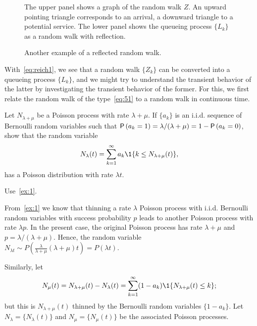 \begin{figure}[ht]
  \centering

%
\caption{The upper panel shows a graph of the random walk $Z$. An
  upward pointing triangle corresponds to an arrival, a downward
  triangle to a potential service. The lower panel shows the queueing
  process $\{L_k\}$ as a random walk with reflection.}
\label{fig:random_bernoulli}
\end{figure}

\begin{figure}[ht]
  \centering

\caption{Another example of a reflected random walk.}
\label{fig:random_walk}
\end{figure}


With~\cref{eq:reich1},  we see that a random walk $\{Z_k\}$ can be converted into a queueing
process $\{L_k\}$, and we might try to understand the transient behavior of the latter by investigating the transient behavior of the former.  For this, we first relate the random walk of the type~\cref{eq:51} to a random walk in continuous time. 

\begin{exercise}
  Let $N_{\lambda+\mu}$ be a Poisson process with rate $\lambda+\mu$. If $\{a_k\}$ is an i.i.d. sequence of Bernoulli random variables such that $\P{a_k=1} = \lambda/(\lambda+\mu)=1-\P{a_k=0}$, show that the random variable
  \begin{equation*}
    N_\lambda(t) = \sum_{k=1}^\infty a_k \1{k \leq N_{\lambda+\mu}(t)},
  \end{equation*}
has a Poisson distribution with rate $\lambda t$. 
\begin{hint}
Use~\cref{ex:1}.
\end{hint}
\begin{solution}
  From~\cref{ex:1} we know that thinning  a rate $\lambda$ Poisson process  with i.i.d. Bernoulli random variables with success probability $p$  leads to another Poisson process with rate $\lambda p$. In the present case, the original Poisson process has rate $\lambda+\mu$ and $p=\lambda/(\lambda+\mu)$. Hence, the random variable $N_{\lambda t}\sim P\left(\frac\lambda{\lambda+\mu} (\lambda+\mu)t\right) = P(\lambda t)$.
\end{solution}
\end{exercise}

Similarly, let
\begin{equation*}
  N_\mu(t) = N_{\lambda+\mu}(t) - N_\lambda(t) = \sum_{k=1}^\infty (1-a_k) \1{N_{\lambda+\mu}(t) \leq k};
\end{equation*}
but this is $N_{\lambda+\mu}(t)$ thinned by the Bernoulli random variables $\{1-a_k\}$. Let  $N_\lambda = \{N_\lambda(t)\}$ and $N_\mu = \{N_\mu(t)\}$  be the associated Poisson processes. 

